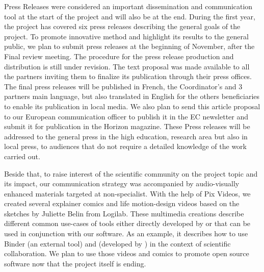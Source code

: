  Press Releases were considered an important dissemination and communication tool at the start of the project and will also be at the end. During the  first year, the project has covered six press releases describing the general goals of the project. To promote \ODK innovative method and highlight its results to the general public, we plan to submit press releases at the beginning of November, after the Final review meeting. The procedure for the press release production and distribution is still under revision. The text proposal was made available to all the partners  inviting them to finalize its publication through their press offices. The final press releases will be published in French, the Coordinator’s and 3 partners main language, but also translated in English for the others beneficiaries to enable its publication in local media. We also plan to send this article proposal to our European communication officer to publish it in the EC newsletter and submit it for publication in the Horizon magazine.  These Press releases will  be  addressed  to   the general press in the high education, research area but also in local press, to audiences that do not require a detailed knowledge of the work carried out.

 Beside that, to raise interest of the scientific community on the project topic and its impact, our communication strategy was accompanied by audio-visually enhanced materials targeted at non-specialist. With the help of Pix Videos, we created several explainer comics and life motion-design videos based on the sketches by Juliette Belin from Logilab. These multimedia creations describe different common use-cases of tools either directly developed by \ODK or that can be used in conjunction with our software. As an example, it describes how to use Binder (an external tool) and \Jupyter (developed by \ODK) in the context of scientific collaboration. We plan to use those videos and comics to promote open source software now that the project itself is ending.



\subparagraph{}



